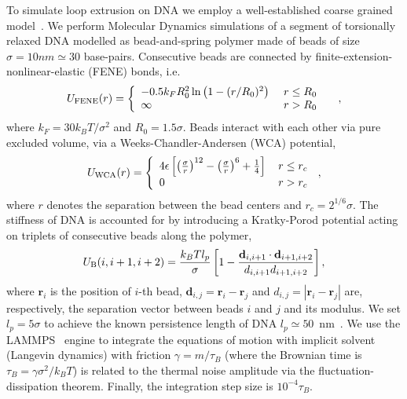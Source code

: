 \documentclass[aps,prl,twocolumn,a4paper,10pt,notitlepage,footinbib,nobalancelastpage,superscriptaddress,showpacs,floatfix]{revtex4-1}%
\begin{document}
To simulate loop extrusion on DNA we employ a well-established coarse grained model~\cite{Fudenberg2016,Brackley2017}. We perform Molecular Dynamics simulations of a segment of torsionally relaxed DNA modelled as bead-and-spring polymer made of beads of size $\sigma=10nm \simeq 30$ base-pairs. Consecutive beads are connected by finite-extension-nonlinear-elastic (FENE) bonds, i.e.
\begin{equation}
\label{eq:Ufene}
U_{\rm FENE}(r) = \left\{
\begin{array}{lcl}
-0.5 k_F R_0^2 \ln\left(1-(r / R_0)^2\right) & \ r\le R_0 \\ \infty & \
r> R_0 &
\end{array} 
\right. \, ,
\end{equation}
where $k_F = 30k_BT/\sigma^2$ and $R_{0}=1.5\sigma$. Beads interact with each other via pure excluded volume, via a Weeks-Chandler-Andersen (WCA) potential, 
\begin{equation}\label{eq:LJ}
U_{\rm WCA}(r) = \left\{
\begin{array}{lr}
4 \epsilon \left[ \left(\frac{\sigma}{r}\right)^{12} - \left(\frac{\sigma}{r}\right)^6 + \frac14 \right] & \, r \le r_c \\
0 & \, r > r_c
\end{array} \right. \, ,
\end{equation}
where $r$ denotes the separation between the bead centers and $r_c=2^{1/6}\sigma$. The stiffness of DNA is accounted for by introducing a Kratky-Porod potential acting on triplets of consecutive beads along the polymer, 
\begin{equation}\label{Ubend}
U_{\rm B}(i,i+1,i+2) = \dfrac{k_BT l_p}{\sigma}\left[ 1 - \dfrac{\mathbf{d}_{i,i+1} \cdot \mathbf{d}_{i+1,i+2}}{d_{i,i+1}d_{i+1,i+2}} \right],
\end{equation}
where {$\mathbf{r}_i$} is the position of {$i$}-th bead,  $\mathbf{d}_{i,j}=\mathbf{r}_i-\mathbf{r}_j$ and $d_{i,j}=|\mathbf{r}_i-\mathbf{r}_j|$ are, respectively, the separation vector between beads $i$ and $j$ and its modulus. We set $l_p=5\sigma$ to achieve the known persistence length of DNA $l_p\simeq50$~nm~\cite{Bustamante1994}. We use the LAMMPS~\cite{Plimpton1995a} engine to integrate the equations of motion with implicit solvent (Langevin dynamics) with friction $\gamma=m/\tau_B$ (where the Brownian time is $\tau_B=\gamma \sigma^2/k_BT$)  is related to the thermal noise amplitude via the fluctuation-dissipation theorem. Finally, the integration step size is $10^{-4}\tau_B$.
\end{document}
